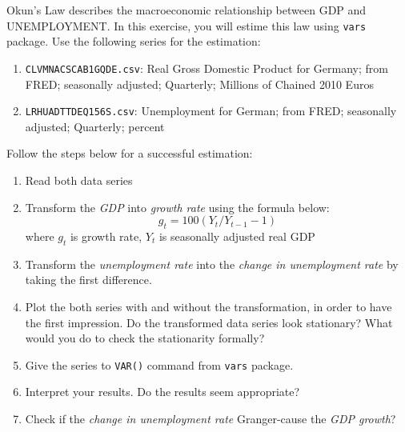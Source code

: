 Okun's Law describes the macroeconomic relationship between GDP and UNEMPLOYMENT. In this exercise, you will estime this law using \verb|vars| package. Use the following series for the estimation:
\begin{enumerate}[label=-]
    \item \verb|CLVMNACSCAB1GQDE.csv|: Real Gross Domestic Product for Germany; from FRED; seasonally adjusted; Quarterly; Millions of Chained 2010 Euros

    \item \verb|LRHUADTTDEQ156S.csv|: Unemployment for German; from FRED; seasonally adjusted; Quarterly; percent
\end{enumerate}

Follow the steps below for a successful estimation:
\begin{enumerate}[label=\roman*.]
    \item Read both data series

    \item Transform the \emph{GDP} into \emph{growth rate} using the formula below:
          \[
              g_t = 100 (Y_t / Y_{t-1} - 1)
          \]
          where $g_t$ is growth rate, $Y_t$ is seasonally adjusted real GDP

    \item Transform the \emph{unemployment rate} into the \emph{change in unemployment rate} by taking the first difference.

    \item Plot the both series with and without the transformation, in order to have the first impression. Do the transformed data series look stationary? What would you do to check the stationarity formally?

    \item Give the series to \verb|VAR()| command from \verb|vars| package.

    \item Interpret your results. Do the results seem appropriate?

    \item Check if the \emph{change in unemployment rate} Granger-cause the \emph{GDP growth}?
\end{enumerate}

